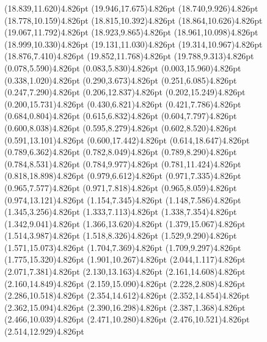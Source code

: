\documentclass[10pt]{article}
\begin{document}
{{\qdisk(18.839,11.620){4.826pt}%
\qdisk(19.946,17.675){4.826pt}%
\qdisk(18.740,9.926){4.826pt}%
\qdisk(18.778,10.159){4.826pt}%
\qdisk(18.815,10.392){4.826pt}%
\qdisk(18.864,10.626){4.826pt}%
\qdisk(19.067,11.792){4.826pt}%
\qdisk(18.923,9.865){4.826pt}%
\qdisk(18.961,10.098){4.826pt}%
\qdisk(18.999,10.330){4.826pt}%
\qdisk(19.131,11.030){4.826pt}%
\qdisk(19.314,10.967){4.826pt}%
\qdisk(18.876,7.410){4.826pt}%
\qdisk(19.852,11.768){4.826pt}%
\qdisk(19.788,9.313){4.826pt}%
\dummycolor
\qdisk(0.078,5.590){4.826pt}%
\qdisk(0.083,5.830){4.826pt}%
\qdisk(0.003,15.960){4.826pt}%
\qdisk(0.338,1.020){4.826pt}%
\qdisk(0.290,3.673){4.826pt}%
\qdisk(0.251,6.085){4.826pt}%
\qdisk(0.247,7.290){4.826pt}%
\qdisk(0.206,12.837){4.826pt}%
\qdisk(0.202,15.249){4.826pt}%
\qdisk(0.200,15.731){4.826pt}%
\qdisk(0.430,6.821){4.826pt}%
\qdisk(0.421,7.786){4.826pt}%
\qdisk(0.684,0.804){4.826pt}%
\qdisk(0.615,6.832){4.826pt}%
\qdisk(0.604,7.797){4.826pt}%
\qdisk(0.600,8.038){4.826pt}%
\qdisk(0.595,8.279){4.826pt}%
\qdisk(0.602,8.520){4.826pt}%
\qdisk(0.591,13.101){4.826pt}%
\qdisk(0.600,17.442){4.826pt}%
\qdisk(0.614,18.647){4.826pt}%
\qdisk(0.789,6.362){4.826pt}%
\qdisk(0.782,8.049){4.826pt}%
\qdisk(0.789,8.290){4.826pt}%
\qdisk(0.784,8.531){4.826pt}%
\qdisk(0.784,9.977){4.826pt}%
\qdisk(0.781,11.424){4.826pt}%
\qdisk(0.818,18.898){4.826pt}%
\qdisk(0.979,6.612){4.826pt}%
\qdisk(0.971,7.335){4.826pt}%
\qdisk(0.965,7.577){4.826pt}%
\qdisk(0.971,7.818){4.826pt}%
\qdisk(0.965,8.059){4.826pt}%
\qdisk(0.974,13.121){4.826pt}%
\qdisk(1.154,7.345){4.826pt}%
\qdisk(1.148,7.586){4.826pt}%
\qdisk(1.345,3.256){4.826pt}%
\qdisk(1.333,7.113){4.826pt}%
\qdisk(1.338,7.354){4.826pt}%
\qdisk(1.342,9.041){4.826pt}%
\qdisk(1.366,13.620){4.826pt}%
\qdisk(1.379,15.067){4.826pt}%
\qdisk(1.514,3.987){4.826pt}%
\qdisk(1.518,8.326){4.826pt}%
\qdisk(1.529,9.290){4.826pt}%
\qdisk(1.571,15.073){4.826pt}%
\qdisk(1.704,7.369){4.826pt}%
\qdisk(1.709,9.297){4.826pt}%
\qdisk(1.775,15.320){4.826pt}%
\qdisk(1.901,10.267){4.826pt}%
\qdisk(2.044,1.117){4.826pt}%
\qdisk(2.071,7.381){4.826pt}%
\qdisk(2.130,13.163){4.826pt}%
\qdisk(2.161,14.608){4.826pt}%
\qdisk(2.160,14.849){4.826pt}%
\qdisk(2.159,15.090){4.826pt}%
\qdisk(2.228,2.808){4.826pt}%
\qdisk(2.286,10.518){4.826pt}%
\qdisk(2.354,14.612){4.826pt}%
\qdisk(2.352,14.854){4.826pt}%
\qdisk(2.362,15.094){4.826pt}%
\qdisk(2.390,16.298){4.826pt}%
\qdisk(2.387,1.368){4.826pt}%
\qdisk(2.466,10.039){4.826pt}%
\qdisk(2.471,10.280){4.826pt}%
\qdisk(2.476,10.521){4.826pt}%
\qdisk(2.514,12.929){4.826pt}%
}}
\end{document}
